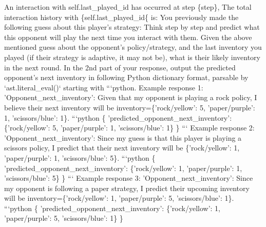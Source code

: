 \documentclass{article} %
\begin{document}
\begin{tcolorbox}[
    title={\small \textbf{ToM Module User Message 3}},
    width=\linewidth, %
    fontupper=\fontsize{9pt}{11pt}\selectfont\ttfamily %
]
An interaction with {self.last\_played\_id} has occurred at step \{step\},
The total interaction history with \{self.last\_played\_id\{ is: 
You previously made the following guess about this player's strategy:
Think step by step and predict what this opponent will play the next time you interact with them.
            Given the above mentioned guess about the opponent's policy/strategy, and the last inventory you played (if their strategy is adaptive, it may not be), what is their likely inventory in the next round.
            In the 2nd part of your response, output the predicted opponent's next inventory in following Python dictionary format, parsable by `ast.literal\_eval()` starting with ```python.
            Example response 1:
            'Opponent\_next\_inventory': Given that my opponent is playing a rock policy, I believe their next inventory will be inventory=\{'rock/yellow': 5, 'paper/purple': 1, 'scissors/blue': 1\}.
            ```python
            \{
              'predicted\_opponent\_next\_inventory': \{'rock/yellow': 5, 'paper/purple': 1, 'scissors/blue': 1\}
            \}
            ```
            Example response 2:
            'Opponent\_next\_inventory': Since my guess is that this player is playing a scissors policy, I predict that their next inventory will be \{'rock/yellow': 1, 'paper/purple': 1, 'scissors/blue': 5\}.
            ```python
            \{
              'predicted\_opponent\_next\_inventory': \{'rock/yellow': 1, 'paper/purple': 1, 'scissors/blue': 5\}
            \}
            ```
            Example response 3:
            'Opponent\_next\_inventory': Since my opponent is following a paper strategy, I predict their upcoming inventory will be inventory=\{'rock/yellow': 1, 'paper/purple': 5, 'scissors/blue': 1\}.
            ```python
            \{
              'predicted\_opponent\_next\_inventory': \{'rock/yellow': 1, 'paper/purple': 5, 'scissors/blue': 1\}
            \}


\end{tcolorbox}
\end{document}
